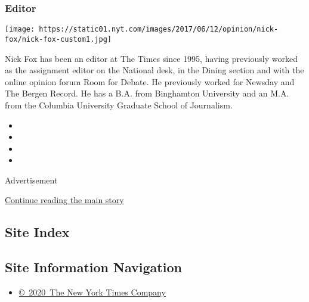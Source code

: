 \begin{itemize}
  \hypertarget{editor}{%
  \subsubsection{Editor}\label{editor}}

  \texttt{[image: https://static01.nyt.com/images/2017/06/12/opinion/nick-fox/nick-fox-custom1.jpg]}

  Nick Fox has been an editor at The Times since 1995, having previously
  worked as the assignment editor on the National desk, in the Dining
  section and with the online opinion forum Room for Debate. He
  previously worked for Newsday and The Bergen Record. He has a B.A.
  from Binghamton University and an M.A. from the Columbia University
  Graduate School of Journalism.
\end{itemize}

\begin{itemize}
\item
\item
\item
\item
\end{itemize}

Advertisement

\protect\hyperlink{after-bottom}{Continue reading the main story}

\hypertarget{site-index}{%
\subsection{Site Index}\label{site-index}}

\hypertarget{site-information-navigation}{%
\subsection{Site Information
Navigation}\label{site-information-navigation}}

\begin{itemize}
\tightlist
\item
  \href{https://help.nytimes.com/hc/en-us/articles/115014792127-Copyright-notice}{©~2020~The
  New York Times Company}
\end{itemize}

